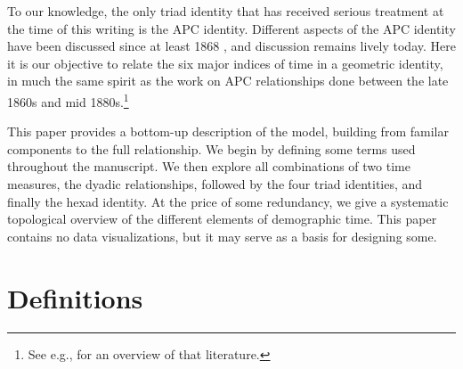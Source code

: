 \documentclass[11pt,oneside,a4paper]{article} %
\begin{document}
To our knowledge, the only triad identity that has received serious
treatment at the time of this writing is the APC identity. Different
aspects of the APC identity have been discussed since at least 1868
\citep{knapp1868ermittlung}, and discussion remains lively today. Here it is our
objective to relate the six major indices of time in a geometric identity, in
much the same spirit as the work on APC relationships done between the late
1860s and mid 1880s.\footnote{See e.g., \citet{keiding2011age} for an overview of that literature.} 

This paper provides a bottom-up description of the model, building from familar
components to the full relationship. We begin by defining some terms used
throughout the manuscript. We then explore all combinations of two time
measures, the dyadic relationships, followed by the four triad identities, and
finally the hexad identity. At the price of some redundancy, we give a systematic topological overview of the
different elements of demographic time. This paper
contains no data visualizations, but it may serve as a basis for designing
some. 

\section*{Definitions}
\end{document}
